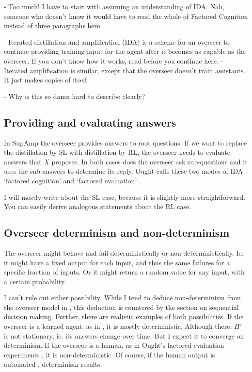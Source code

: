 \documentclass{farlamp}
\begin{document}
- Too much! I have to start with assuming an understanding of IDA. Nah, someone
who doesn't know it would have to read the whole of Factored Cognition instead
of three paragraphs here.

- Iterated distillation and amplification (IDA) is a scheme for an overseer to
continue providing training input for the agent after it becomes as capable as
the overseer. If you don't know how it works, read \textcite{CotrIDA} before you
continue here.
- Iterated amplification is similar, except that the overseer doesn't train
assistants. It just makes copies of itself

- Why is this so damn hard to describe clearly?


\subsection{Providing and evaluating answers}

In SupAmp \parencite{CSASupAmp} the overseer provides answers to root questions.
If we want to replace the distillation by SL with distillation by RL, the
overseer needs to evaluate answers that $X$ proposes. In both cases does the
overseer ask sub-questions and it uses the sub-answers to determine its reply.
Ought calls these two modes of IDA \parencite[see][]{CotrIDA} ‘factored
cognition’ \parencite{StuhFacCog} and ‘factored evaluation’
\parencite{StuhDelCog}.

I will mostly write about the SL case, because it is slightly more
straightforward. You can easily derive analogous statements about the RL case.


\subsection{Overseer determinism and non-determinism}

The overseer might behave and fail deterministically or non-deterministically.
Ie. it might have a fixed output for each input, and thus the same failures for
a specific fraction of inputs. Or it might return a random value for any input,
with a certain probability.

I can't rule out either possibility. While I tend to deduce non-determinism from
the overseer model in \textcite{ChriRelAmp}, this deduction is countered by the
section on sequential decision making. Further, there are realistic examples of
both possibilities. If the overseer is a learned agent, as in
\textcite{CSASupAmp}, it is mostly deterministic. Although there, $H'$ is not
stationary, ie. its answers change over time. But I expect it to converge on
determinism. If the overseer is a human, as in Ought's factored evaluation
experiments \parencite{StuhDelCog}, it is non-deterministic. Of course, if the
human output is automated \parencite[see][sec. ‘Caching’ f.]{StuhTaxCapAmp},
determinism results.
\end{document}
